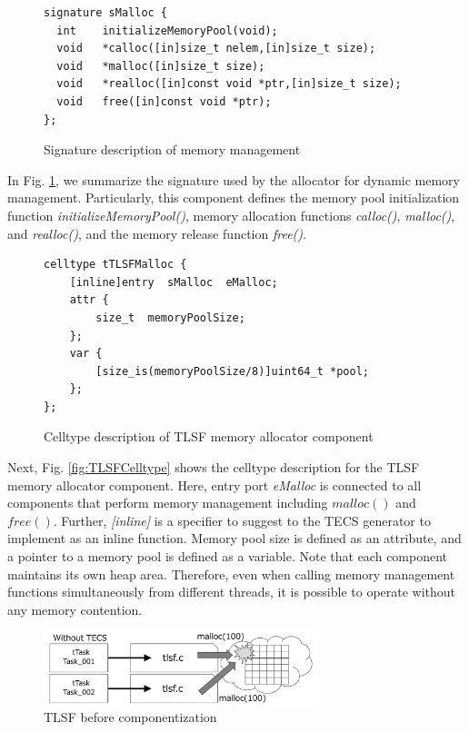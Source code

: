 \documentclass[JIP]{ipsj_v2/UTF8/ipsj}
\begin{document}
\begin{figure}[t]
\centering
\begin{lstlisting}
signature sMalloc {
  int    initializeMemoryPool(void);
  void   *calloc([in]size_t nelem,[in]size_t size);
  void   *malloc([in]size_t size);
  void   *realloc([in]const void *ptr,[in]size_t size);
  void   free([in]const void *ptr);
};
\end{lstlisting}
\caption{Signature description of memory management}  
\label{src:TLSFSignature}
\end{figure}

In Fig. \ref{src:TLSFSignature}, we summarize the signature used by the allocator for dynamic memory management.
Particularly, this component defines the memory pool initialization function {\it initializeMemoryPool()}, memory allocation functions {\it calloc()}, {\it malloc()}, and {\it realloc()}, and the memory release function {\it free()}.

\begin{figure}[t]
\centering
\begin{lstlisting}
celltype tTLSFMalloc {
    [inline]entry  sMalloc  eMalloc;
    attr {
        size_t  memoryPoolSize;
    };
    var {
        [size_is(memoryPoolSize/8)]uint64_t *pool;
    };
};
\end{lstlisting}
\caption{Celltype description of TLSF memory allocator component}  
\label{src:TLSFCelltype}
\end{figure}

Next, Fig. \ref{fig:TLSFCelltype} shows the celltype description for the TLSF memory allocator component.
Here, entry port {\it eMalloc} is connected to all components that perform memory management including $malloc()$ and $free()$.
Further, {\it [inline]} is a specifier to suggest to the TECS generator to implement as an inline function.
Memory pool size is defined as an attribute, and a pointer to a memory pool is defined as a variable.
Note that each component maintains its own heap area.
Therefore, even when calling memory management functions simultaneously from different threads, it is possible to operate without any memory contention.

\begin{figure}[t]
    \centering
    \includegraphics[width=8cm,clip]{figure/WithoutTECS.pdf}
    \caption{TLSF before componentization}
    \label{fig:WithoutTECS}
\end{figure}
\end{document}
